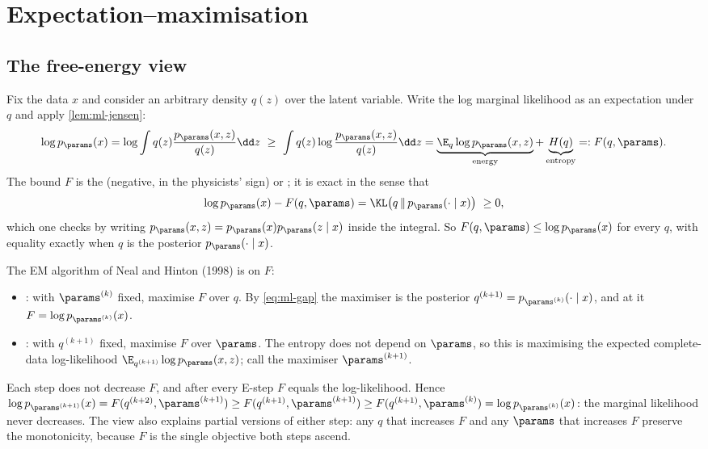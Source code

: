 \section{Expectation--maximisation}

\subsection{The free-energy view}

Fix the data $x$ and consider an arbitrary density $q(z)$ over the latent variable.
Write the log marginal likelihood as an expectation under $q$ and apply
\cref{lem:ml-jensen}:
\begin{equation}
  \log p_\params(x)=\log\int q(z)\frac{p_\params(x,z)}{q(z)}\dd z
  \ \ge\ \int q(z)\log\frac{p_\params(x,z)}{q(z)}\dd z
  =\underbrace{\E_q\log p_\params(x,z)}_{\text{energy}}+\underbrace{H(q)}_{\text{entropy}}
  =:F(q,\params).
  \label{eq:ml-elbo}
\end{equation}
The bound $F$ is the  (negative, in the physicists' sign) or
; it is exact in the sense that
\begin{equation}
  \log p_\params(x)-F(q,\params)=\KL\bigl(q\,\|\,p_\params(\cdot\mid x)\bigr)\ \ge0,
  \label{eq:ml-gap}
\end{equation}
which one checks by writing $p_\params(x,z)=p_\params(x)p_\params(z\mid x)$ inside the
integral. So $F(q,\params)\le\log p_\params(x)$ for every $q$, with equality exactly when
$q$ is the posterior $p_\params(\cdot\mid x)$.

The EM algorithm of Neal and Hinton (1998) is  on $F$:
\begin{itemize}
\item {}: with $\params^{(k)}$ fixed, maximise $F$ over $q$. By
\cref{eq:ml-gap} the maximiser is the posterior $q^{(k+1)}=p_{\params^{(k)}}(\cdot\mid x)$,
and at it $F=\log p_{\params^{(k)}}(x)$.
\item {}: with $q^{(k+1)}$ fixed, maximise $F$ over $\params$. The entropy
does not depend on $\params$, so this is maximising the expected complete-data
log-likelihood $\E_{q^{(k+1)}}\log p_\params(x,z)$; call the maximiser $\params^{(k+1)}$.
\end{itemize}
Each step does not decrease $F$, and after every E-step $F$ equals the log-likelihood.
Hence $\log p_{\params^{(k+1)}}(x)=F(q^{(k+2)},\params^{(k+1)})\ge F(q^{(k+1)},\params^{(k+1)})\ge F(q^{(k+1)},\params^{(k)})=\log p_{\params^{(k)}}(x)$:
the marginal likelihood never decreases. The view also explains partial versions of
either step: any $q$ that increases $F$ and any $\params$ that increases $F$ preserve
the monotonicity, because $F$ is the single objective both steps ascend.

